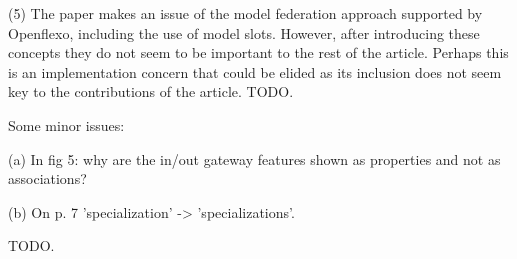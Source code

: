 \documentclass[10pt]{article}
\begin{document}
\begin{response}{(5) The paper makes an issue of the model federation approach supported by Openflexo, including the use of model slots. However, after introducing these concepts they do not seem to be important to the rest of the article. Perhaps this is an implementation concern that could be elided as its inclusion does not seem key to the contributions of the article. } 
TODO.
\end{response}

\begin{response}{Some minor issues:

(a) In fig 5: why are the in/out gateway features shown as properties and not as associations?

(b) On p. 7 'specialization' -> 'specializations'.} 
TODO.
\end{response}
\end{document}
